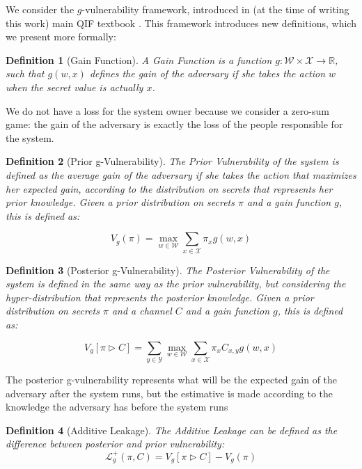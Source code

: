 \documentclass[conference]{IEEEtran}
\newtheorem{definition}{Definition}
\begin{document}
We consider the $g$-vulnerability framework, introduced in (at the time of writing this work) main QIF textbook \cite{QIF}. This framework introduces new definitions, which we present more formally:

\begin{definition}[Gain Function]
A \emph{Gain Function} is a function $g : \mathcal{W} \times \mathcal{X} \rightarrow \mathbb{R}$, such that $g(w,x)$ defines the gain of the adversary if she takes the action $w$ when the secret value is actually $x$. 
\end{definition}

We do not have a loss for the system owner because we consider a zero-sum game: the gain of the adversary is exactly the loss of the people responsible for the system. 

\begin{definition}[Prior g-Vulnerability]
The \emph{Prior Vulnerability} of the system is defined as the average gain of the adversary if she takes the action that maximizes her expected gain, according to the distribution on secrets that represents her prior knowledge. Given a prior distribution on secrets $\pi$ and a gain function $g$, this is defined as:

$$V_g(\pi) = \max\limits_{w\in \mathcal{W}}\sum\limits_{x\in\mathcal{X}} \pi_x g(w,x)$$
\end{definition}

\begin{definition}[Posterior g-Vulnerability]
The \emph{Posterior Vulnerability} of the system is defined in the same way as the prior vulnerability, but considering the hyper-distribution that represents the posterior knowledge. Given a prior distribution on secrets $\pi$ and a channel $C$ and a gain function $g$, this is defined as:

$$V_g[\pi\triangleright C] = \sum\limits_{y \in \mathcal{Y}}\max\limits_{w\in \mathcal{W}}\sum\limits_{x\in\mathcal{X}} \pi_xC_{x,y} g(w,x)$$
\end{definition}

The posterior g-vulnerability represents what will be the expected gain of the adversary after the system runs, but the estimative is made according to the knowledge the adversary has before the system runs

\begin{definition}[Additive Leakage]
The \emph{Additive Leakage} can be defined as the difference between posterior and prior vulnerability:
$$\mathcal{L}_g^+(\pi,C) = V_g[\pi\triangleright C]-V_g(\pi)$$
\end{definition}
\end{document}
